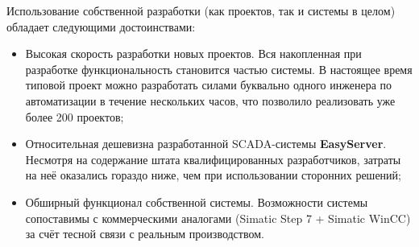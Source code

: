 Использование собственной разработки (как проектов, так и системы в целом)
обладает следующими достоинствами:
\begin{itemize}
    \item Высокая скорость разработки новых проектов. Вся накопленная при
    разработке функциональность становится частью системы. В настоящее время
    типовой проект можно разработать силами буквально одного инженера по
    автоматизации в течение нескольких часов, что позволило реализовать уже
    более 200 проектов;
    \item Относительная дешевизна разработанной SCADA-системы
    \textbf{EasyServer}. Несмотря на содержание штата квалифицированных
    разработчиков, затраты на неё оказались гораздо ниже, чем при использовании
    сторонних решений;
    \item Обширный функционал собственной системы. Возможности системы
    сопоставимы с коммерческими аналогами (Simatic Step 7 + Simatic WinCC) за
    счёт тесной связи с реальным производством.
\end{itemize}

